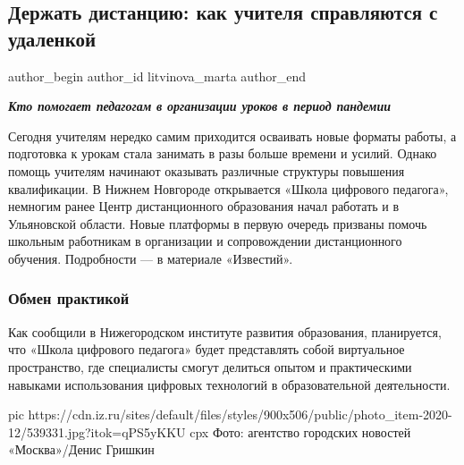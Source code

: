  
 
 
 
 
 
\subsection{Держать дистанцию: как учителя справляются с удаленкой}
\label{sec:09_12_2020.news.ru.izvestia.litvinova_marta.1.uchitelja_udalenka}
\ifcmt
	author_begin
   author_id litvinova_marta
	author_end
\fi

\begin{center}
\color{orange}\textbf{\em Кто помогает педагогам в организации уроков в период пандемии}
\end{center}

Сегодня учителям нередко самим приходится осваивать новые форматы работы, а
подготовка к урокам стала занимать в разы больше времени и усилий. Однако
помощь учителям начинают оказывать различные структуры повышения квалификации.
В Нижнем Новгороде открывается «Школа цифрового педагога», немногим ранее Центр
дистанционного образования начал работать и в Ульяновской области. Новые
платформы в первую очередь призваны помочь школьным работникам в организации и
сопровождении дистанционного обучения. Подробности — в материале «Известий».

\subsubsection{Обмен практикой}

Как сообщили в Нижегородском институте развития образования, планируется, что
«Школа цифрового педагога» будет представлять собой виртуальное пространство,
где специалисты смогут делиться опытом и практическими навыками использования
цифровых технологий в образовательной деятельности.

\ifcmt
pic https://cdn.iz.ru/sites/default/files/styles/900x506/public/photo_item-2020-12/539331.jpg?itok=qPS5yKKU
cpx  Фото: агентство городских новостей «Москва»/Денис Гришкин
\fi

